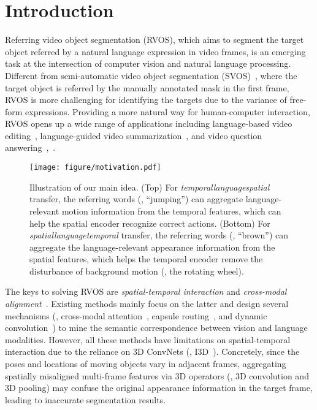 \documentclass[10pt,twocolumn,letterpaper]{article}
\begin{document}
\section{Introduction}
\label{sec:intro}

Referring video object segmentation (RVOS), which aims to segment the target object referred by a natural language expression in video frames, is an emerging task at the intersection of computer vision and natural language processing.
Different from semi-automatic video object segmentation (SVOS)~\cite{wang2021swiftnet,park2021learning,duke2021sstvos,ge2021video}, where the target object is referred by the manually annotated mask in the first frame, RVOS is more challenging for identifying the targets due to the variance of free-form expressions. Providing a more natural way for human-computer interaction, RVOS opens up a wide range of applications including language-based video editing~\cite{fu2021language}, language-guided video summarization~\cite{narasimhan2021clip}, and video question answering~\cite{jang2017tgif,xu2016msr},~\etc.

\begin{figure}[t]
	\centering
		\texttt{[image: figure/motivation.pdf]}
	\caption{Illustration of our main idea. (Top) For \textit{temporal}\textit{language}\textit{spatial} transfer, the referring words (\eg, ``jumping'') can aggregate language-relevant motion information from the temporal features, which can help the spatial encoder recognize correct actions. (Bottom) For \textit{spatial}\textit{language}\textit{temporal} transfer, the referring words (\eg, ``brown'') can aggregate the language-relevant appearance information from the spatial features, which helps the temporal encoder remove the disturbance of background motion (\eg, the rotating wheel).}

	\label{fig:motivation}
	
\end{figure}

The keys to solving RVOS are \textit{spatial-temporal interaction} and \textit{cross-modal alignment}~\cite{HuiH0DLWH021,ye2021referring}. Existing methods mainly focus on the latter and design several mechanisms (\eg, cross-modal attention~\cite{WangDYT19,NingXW020}, capsule routing~\cite{mcintosh2020visual}, and dynamic convolution~\cite{GavrilyukGLS18, WangDMY20}) to mine the semantic correspondence between vision and language modalities. However, all these methods have limitations on spatial-temporal 
interaction due to the reliance on 3D ConvNets (\eg, I3D~\cite{CarreiraZ17}). Concretely, since the poses and locations of moving objects vary in adjacent frames, aggregating spatially misaligned multi-frame features via 3D operators (\eg, 3D convolution and 3D pooling) may confuse the original appearance information in the target frame, leading to inaccurate segmentation results.
\end{document}
